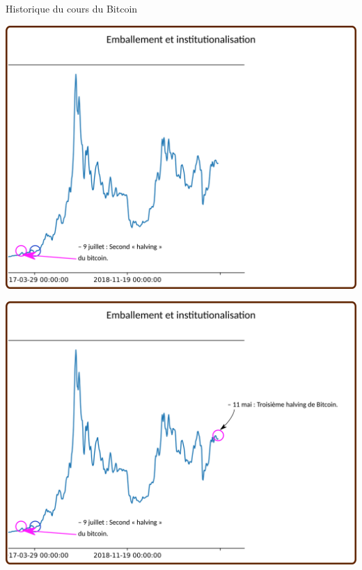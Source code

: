 \documentclass[presentation]{beamer}
\begin{document}
\begin{frame}[label={sec:org6ff9387}]{Historique du cours du Bitcoin}
\begin{block}{}
\begin{center}
\includegraphics[width=.95\textwidth]{./Pictures/Timeline/60emballement_halving.png}
\end{center}
\end{block}

\begin{block}{}
\begin{center}
\includegraphics[width=.95\textwidth]{./Pictures/Timeline/61emballement_halving2.png}
\end{center}
\end{block}


\end{frame}
\end{document}
